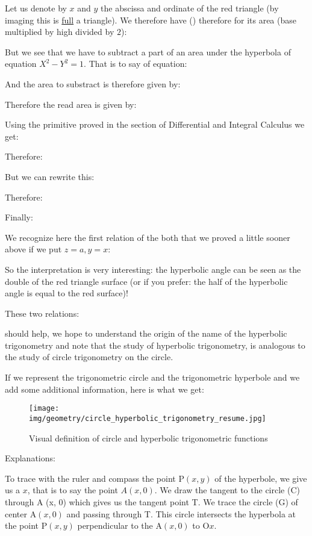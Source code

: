 	Let us denote by $x$ and $y$ the abscissa and ordinate of the red triangle (by imaging this is \underline{full} a triangle). We therefore have () therefore for its area (base multiplied by high divided by $2$):
	
	But we see that we have to subtract a part of an area under the hyperbola of equation $X^2-Y^2=1$. That is to say of equation:
	
	And the area to substract is therefore given by:
	
	Therefore the read area is given by:
	
	Using the primitive proved in the section of Differential and Integral Calculus we get:
	
	Therefore:
	
	But we can rewrite this:
	
	Therefore:
	
	Finally:
	
	We recognize here the first relation of the both that we proved a little sooner above if we put $z=a,y=x$:

	So the interpretation is very interesting: the hyperbolic angle can be seen as the double of the red triangle surface (or if you prefer: the half of the hyperbolic angle is equal to the red surface)!
	
	These two relations:
	
	
	should help, we hope to understand the origin of the name of the hyperbolic trigonometry and note that the study of hyperbolic trigonometry, is analogous to the study of circle trigonometry on the circle.
	
	If we represent the trigonometric circle and the trigonometric hyperbole and we add some additional information, here is what we get:
	\begin{figure}[H]
	\centering
	\texttt{[image: img/geometry/circle\_hyperbolic\_trigonometry\_resume.jpg]}
	\caption{Visual definition of circle and hyperbolic trigonometric functions}
	\end{figure}
	Explanations: 

	To trace with the ruler and compass the point P$(x, y)$ of the hyperbole, we give us a $x$, that is to say the point $A(x, 0)$. We draw the tangent to the circle (C) through A (x, 0) which gives us the tangent point T. We trace the circle (G) of center A$(x, 0)$ and passing through T. This circle intersects the hyperbola at the point P$(x, y)$ perpendicular to the A$(x, 0)$ to $\text{O}x$.
	
